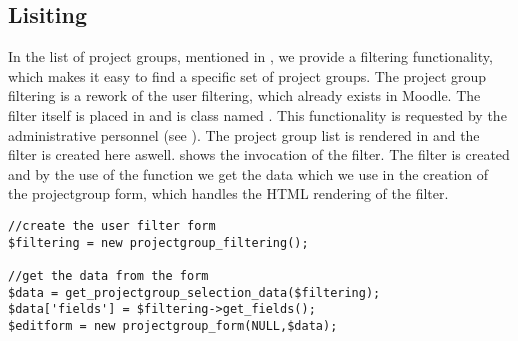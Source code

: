 \subsection{Lisiting}
In the list of project groups, mentioned in , we provide a filtering functionality, which makes it easy to find a specific set of project groups.
The project group filtering is a rework of the user filtering, which already exists in Moodle.
The filter itself is placed in  and is class named .
This functionality is requested by the administrative personnel (see ).
The project group list is rendered in  and the filter is created here aswell. 
 shows the invocation of the filter. 
The filter is created and by the use of the function  we get the data which we use in the creation of the projectgroup form, which handles the HTML rendering of the filter. 
\begin{lstlisting}[style=phpCode, caption=\myCaption{The invocation of the filtering mechanism}, label=moodlefiltering]
//create the user filter form
$filtering = new projectgroup_filtering();

//get the data from the form
$data = get_projectgroup_selection_data($filtering);
$data['fields'] = $filtering->get_fields();
$editform = new projectgroup_form(NULL,$data);
\end{lstlisting}\begin{comment}$\end{comment}

